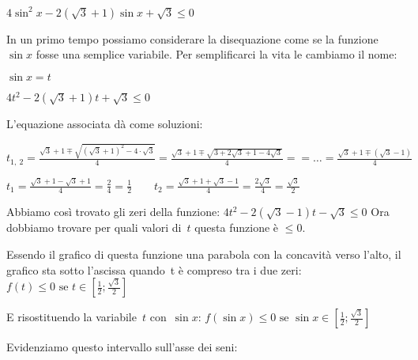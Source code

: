  \begin{esempio}
  \(4 \sin^2 x - 2 (\sqrt{3} + 1) \sin x + \sqrt{3} \le 0\)
  
  In un primo tempo possiamo considerare la disequazione come se la funzione 
  \(\sin x\) fosse una semplice variabile.
  Per semplificarci la vita le cambiamo il nome:
  
  \(\sin x = t\)
  
  \(4 t^2 - 2 (\sqrt{3} + 1) t + \sqrt{3} \le 0\)
  
  L'equazione associata dà come soluzioni:
  
  \(t_{1,~2} = 
   \frac{\sqrt{3} + 1 \mp \sqrt{(\sqrt{3} + 1)^2 - 4 \cdot \sqrt{3}}}{4} =  
   \frac{\sqrt{3} + 1 \mp \sqrt{3 + 2 \sqrt{3} +1 -  4 \sqrt{3}}}{4} = 
   = \dots = \frac{\sqrt{3} + 1 \mp (\sqrt{3} -1)}{4}\)

  \(t_{1} = \frac{\sqrt{3} + 1 - \sqrt{3} +1}{4} = 
           \frac{2}{4} = \frac{1}{2} \qquad
   t_{2} = \frac{\sqrt{3} + 1 + \sqrt{3} -1}{4} = 
           \frac{2 \sqrt{3}}{4} = \frac{\sqrt{3}}{2} \)
  
  Abbiamo così trovato gli zeri della funzione: 
  \(4 t^2 - 2 (\sqrt{3} - 1) t - \sqrt{3} \le 0\)
  Ora dobbiamo trovare per quali valori di~\(t\) questa funzione è \(\le 0\).
  
  Essendo il grafico di questa funzione una parabola con la concavità verso 
  l'alto, il grafico sta sotto l'ascissa quando~t è compreso tra i due zeri:
  \(f(t) \le 0 \text{ se } 
        t \in \left[\frac{1}{2}; \frac{\sqrt{3}}{2} \right]\) 
  
  E risostituendo la variabile~\(t\) con~\(\sin x\):
  \(f(\sin x) \le 0 \text{ se } 
        \sin x \in \left[\frac{1}{2}; \frac{\sqrt{3}}{2} \right]\) 
        
  Evidenziamo questo intervallo sull'asse dei seni:
  
 \vspace{-6pt}
  \begin{center}
\begin{inaccessibleblock}
    
\end{inaccessibleblock}
  \end{center}


\end{esempio}
